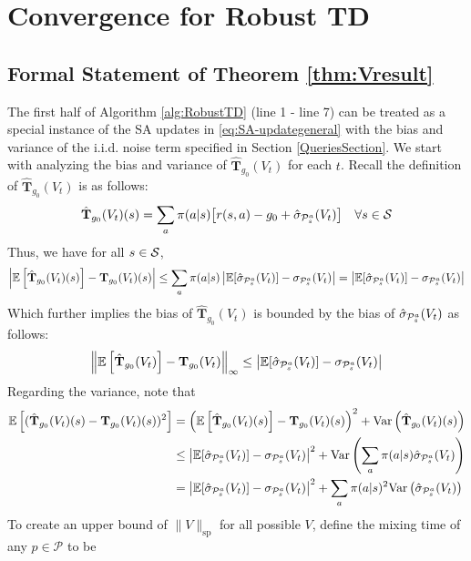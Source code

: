 \section{Convergence for Robust TD} \label{proof:VGresults}
\subsection{Formal Statement of Theorem \ref{thm:Vresult}}
The first half of Algorithm \ref{alg:RobustTD} (line 1 - line 7) can be treated as a special instance of the SA updates in \eqref{eq:SA-updategeneral} with the bias and variance of the i.i.d. noise term specified in Section \ref{QueriesSection}. We start with analyzing the bias and variance of $\hat{\mathbf{T}}_{g_0}(V_t)$ for each $t$. Recall the definition of $\hat{\mathbf{T}}_{g_0}(V_t)$ is as follows:
$$
\hat{\mathbf{T}}_{g_0}(V_t)(s) = \sum_{a} \pi(a|s) \big[ r(s,a) - g_0 +  \hat{\sigma}_{\mathcal{P}^a_s}(V_t) \big] \quad \forall s \in \mathcal{S}
$$
Thus, we have for all $s\in\mathcal{S}$,
\begin{equation}
    \left | \mathbb{E}\left[\hat{\mathbf{T}}_{g_0}(V_t)(s)\right] - {\mathbf{T}}_{g_0}(V_t)(s) \right | \leq  \sum_{a} \pi(a|s) \left | \mathbb{E}[\hat{\sigma}_{\mathcal{P}^a_s}(V_t)] - {\sigma}_{\mathcal{P}^a_s}(V_t)  \right | = \left | \mathbb{E}[\hat{\sigma}_{\mathcal{P}^a_s}(V_t)] - {\sigma}_{\mathcal{P}^a_s}(V_t)  \right | 
\end{equation}
Which further implies the bias of $\hat{\mathbf{T}}_{g_0}(V_t)$ is bounded by the bias of $\hat{\sigma}_{\mathcal{P}^a_s}(V_t)$ as follows:
\begin{equation}
\left\lVert\mathbb{E}\left[\hat{\mathbf{T}}_{g_0}(V_t)\right] - {\mathbf{T}}_{g_0}(V_t)\right\rVert_\infty \leq \left | \mathbb{E}[\hat{\sigma}_{\mathcal{P}^a_s}(V_t)] - {\sigma}_{\mathcal{P}^a_s}(V_t) \right |
\end{equation}
Regarding the variance, note that
\begin{align}
    \mathbb{E}\left[(\hat{\mathbf{T}}_{g_0}(V_t)(s)-{\mathbf{T}}_{g_0}(V_t)(s))^2\right] &=  \left(\mathbb{E}\left[\hat{\mathbf{T}}_{g_0}(V_t)(s)\right] - {\mathbf{T}}_{g_0}(V_t)(s)\right)^2+ \mathrm{Var}\left(  \hat{\mathbf{T}}_{g_0}(V_t)(s)  \right) \nonumber\\
    &\leq\left | \mathbb{E}[\hat{\sigma}_{\mathcal{P}^a_s}(V_t)] - {\sigma}_{\mathcal{P}^a_s}(V_t) \right |^2+ \mathrm{Var}\left( \sum_{a} \pi(a|s)  \hat{\sigma}_{\mathcal{P}^a_s}(V_t)  \right) \nonumber\\
    &=\left | \mathbb{E}[\hat{\sigma}_{\mathcal{P}^a_s}(V_t)] - {\sigma}_{\mathcal{P}^a_s}(V_t) \right |^2+ \sum_{a} \pi(a|s)^2 \mathrm{Var}\left(  \hat{\sigma}_{\mathcal{P}^a_s}(V_t)  \right) 
\end{align}
To create an upper bound of $\|V\|_{\mathrm{sp}}$ for all possible $V$, define the mixing time of any $p\in\mathcal{P}$ to be
